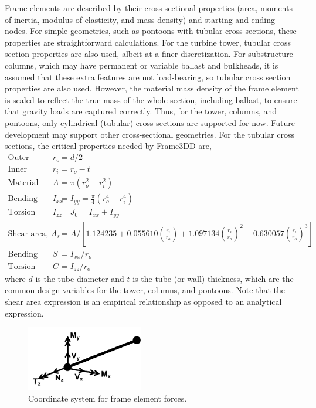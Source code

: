 Frame elements are described by their cross sectional properties (area,
moments of inertia, modulus of elasticity, and mass density) and
starting and ending nodes.  For simple geometries, such as pontoons with
tubular cross sections, these properties are straightforward
calculations.  For the turbine tower, tubular cross section properties
are also used, albeit at a finer discretization.  For substructure
columns, which may have permanent or variable ballast and bulkheads,
it is assumed that these extra features are not load-bearing, so
tubular cross section properties are also used.  However, the material mass
density of the frame element is scaled to reflect the true mass of the
whole section, including ballast, to ensure that gravity loads are
captured correctly.  Thus, for the tower,
columns, and pontoons, only cylindrical (tubular) cross-sections are
supported for now.  Future development may support other cross-sectional
geometries.  For the tubular cross sections, the critical properties needed by
Frame3DD are,
\begin{align*}
  \textrm{Outer radius, } r_o &= d/2\\
  \textrm{Inner radius, } r_i &= r_o - t\\
  \textrm{Material area, } A &= \pi \left( r_o^2 - r_i^2 \right)\\
  \textrm{Bending second moment of area, } I_{xx} &= I_{yy} = \frac{\pi}{4}\left( r_o^4 - r_i^4 \right)\\
  \textrm{Torsion second moment of area, } I_{zz} &= J_0 = I_{xx} + I_{yy}\\
  \textrm{Shear area, } A_{s} &= A / \left[ 1.124235 + 0.055610\left(\frac{r_i}{r_o}\right) +
           1.097134\left(\frac{r_i}{r_o}\right)^2 - 0.630057\left(\frac{r_i}{r_o}\right)^3 \right]\\
  \textrm{Bending modulus, } S &= I_{xx} / r_o \\
  \textrm{Torsion modulus (shear constant), } C &= I_{zz} / r_o
\end{align*}
where $d$ is the tube diameter and $t$ is the tube (or wall) thickness,
which are the common design variables for the tower, columns, and
pontoons. Note that the shear area expression is an empirical relationship as
opposed to an analytical expression.

\begin{figure}
  \begin{center}
    \includegraphics[width=2in]{figs/frameCS.pdf}
    \caption{Coordinate system for frame element forces.}
    \label{fig:frameCS}
  \end{center}
\end{figure}

